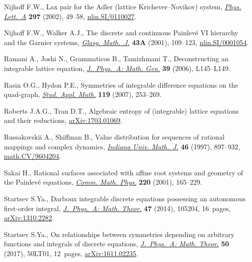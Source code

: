 \documentclass[pdftex]{sigma}
\numberwithin{equation}{section}
\begin{document}
\begin{thebibliography}{99}
Nijhof\/f F.W., Lax pair for the {A}dler (lattice {K}richever--{N}ovikov) system,
 \href{https://doi.org/10.1016/S0375-9601(02)00287-6}{\textit{Phys. Lett.~A}} \textbf{297} (2002), 49--58, \href{https://arxiv.org/abs/nlin.SI/0110027}{nlin.SI/0110027}.

Nijhof\/f F.W., Walker A.J., The discrete and continuous {P}ainlev\'e {VI}
 hierarchy and the {G}arnier systems, \href{https://doi.org/10.1017/S0017089501000106}{\textit{Glasg. Math.~J.}} \textbf{43A}
 (2001), 109--123, \href{https://arxiv.org/abs/nlin.SI/0001054}{nlin.SI/0001054}.

Ramani A., Joshi N., Grammaticos B., Tamizhmani T., Deconstructing an
 integrable lattice equation, \href{https://doi.org/10.1088/0305-4470/39/8/L01}{\textit{J.~Phys.~A: Math. Gen.}} \textbf{39}
 (2006), L145--L149.

Rasin O.G., Hydon P.E., Symmetries of integrable dif\/ference equations on the
 quad-graph, \href{https://doi.org/10.1111/j.1467-9590.2007.00385.x}{\textit{Stud. Appl. Math.}} \textbf{119} (2007), 253--269.

Roberts J.A.G., Tran D.T., Algebraic entropy of (integrable) lattice equations
 and their reductions, \href{https://arxiv.org/abs/1703.01069}{arXiv:1703.01069}.

Russakovskii A., Shif\/fman B., Value distribution for sequences of rational
 mappings and complex dynamics, \href{https://doi.org/10.1512/iumj.1997.46.1441}{\textit{Indiana Univ. Math.~J.}} \textbf{46}
 (1997), 897--932, \href{https://arxiv.org/abs/math.CV/9604204}{math.CV/9604204}.

Sakai H., Rational surfaces associated with af\/f\/ine root systems and geometry of
 the {P}ainlev\'e equations, \href{https://doi.org/10.1007/s002200100446}{\textit{Comm. Math. Phys.}} \textbf{220} (2001),
 165--229.

Startsev S.Ya., Darboux integrable discrete equations possessing an autonomous
 f\/irst-order integral, \href{https://doi.org/10.1088/1751-8113/47/10/105204}{\textit{J.~Phys.~A: Math. Theor.}} \textbf{47} (2014),
 105204, 16~pages, \href{https://arxiv.org/abs/1310.2282}{arXiv:1310.2282}.

Startsev S.Ya., On relationships between symmetries depending on arbitrary
 functions and integrals of discrete equations, \href{https://doi.org/10.1088/1751-8121/aa9261}{\textit{J.~Phys.~A: Math.
 Theor.}} \textbf{50} (2017), 50LT01, 12~pages, \href{https://arxiv.org/abs/1611.02235}{arXiv:1611.02235}.


\end{thebibliography}
\end{document}
